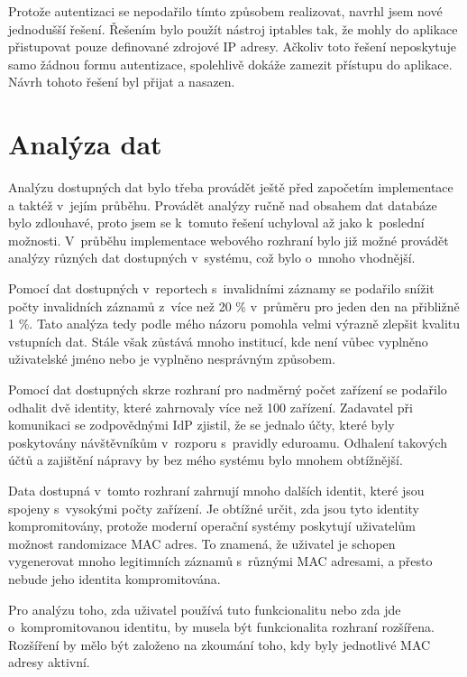 \documentclass[thesis=M,czech]{FITthesis}[2012/06/26]
\begin{document}
      Protože autentizaci se nepodařilo tímto způsobem realizovat, navrhl jsem nové jednodušší řešení.
      Řešením bylo použít nástroj iptables tak,
      že mohly do aplikace přistupovat pouze definované zdrojové IP adresy.
      Ačkoliv toto řešení neposkytuje samo žádnou formu autentizace,
      spolehlivě dokáže zamezit přístupu do aplikace.
      Návrh tohoto řešení byl přijat a nasazen.

    \section{Analýza dat}
      
      Analýzu dostupných dat bylo třeba provádět ještě před započetím implementace
      a taktéž v~jejím průběhu.
      Provádět analýzy ručně nad obsahem dat databáze bylo zdlouhavé,
      proto jsem se k~tomuto řešení uchyloval až jako k~poslední možnosti.
      V~průběhu implementace webového rozhraní bylo již možné provádět
      analýzy různých dat dostupných v~systému, což bylo o~mnoho vhodnější.

      Pomocí dat dostupných v~reportech s~invalidními záznamy se podařilo
      snížit počty invalidních záznamů z~více než 20 \% v~průměru pro jeden den na přibližně 1 \%.
      Tato analýza tedy podle mého názoru pomohla velmi výrazně zlepšit kvalitu
      vstupních dat.
      Stále však zůstává mnoho institucí, kde není vůbec vyplněno uživatelské jméno
      nebo je vyplněno nesprávným způsobem.

      Pomocí dat dostupných skrze rozhraní pro nadměrný počet zařízení se
      podařilo odhalit dvě identity, které zahrnovaly více než 100 zařízení.
      Zadavatel při komunikaci se zodpovědnými IdP zjistil, 
      že se jednalo účty, 
      které byly poskytovány návštěvníkům v~rozporu s~pravidly eduroamu. 
      Odhalení takových účtů a zajištění nápravy by bez mého systému bylo mnohem obtížnější.
      
      Data dostupná v~tomto rozhraní zahrnují mnoho dalších identit, které
      jsou spojeny s~vysokými počty zařízení.
      Je obtížné určit, zda jsou tyto identity kompromitovány,
      protože moderní operační systémy poskytují uživatelům
      možnost randomizace MAC adres.
      To znamená, že uživatel je schopen vygenerovat mnoho legitimních
      záznamů s~různými MAC adresami, a přesto nebude jeho identita kompromitována.

      Pro analýzu toho, zda uživatel používá tuto funkcionalitu nebo zda jde
      o~kompromitovanou identitu, by musela být funkcionalita rozhraní rozšířena.
      Rozšíření by mělo být založeno na zkoumání toho, kdy byly
      jednotlivé MAC adresy aktivní.
\end{document}

